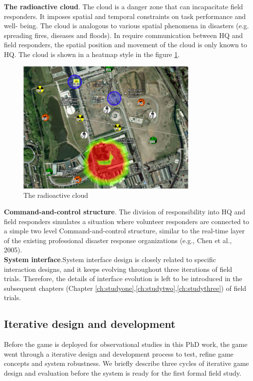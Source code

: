 \textbf{The radioactive cloud}. The cloud is a danger zone that can incapacitate field responders. It imposes spatial and temporal constraints on task performance and well- being. The cloud is analogous to various spatial phenomena in disasters (e.g. spreading fires, diseases and floods). In require communication between HQ and field responders, the spatial position and movement of the cloud is only known to HQ. The cloud is shown in a heatmap style in the figure \ref{fig:cloud}. \\

\begin{figure}[h]
  \centering
  \includegraphics[width=0.8\textwidth]{img/approach/radioactiveCloud}
  \caption{The radioactive cloud}
  \label{fig:cloud}
\end{figure}

\textbf{Command-and-control structure}. The division of responsibility into HQ and field responders simulates a situation where volunteer responders are connected to a simple two level Command-and-control structure, similar to the real-time layer of the existing professional disaster response organizations (e.g., Chen et al., 2005).\\

\textbf{System interface}.System interface design is closely related to specific interaction designs, and it keeps evolving throughout three iterations of field trials. Therefore, the details of interface evolution is left to be introduced in the subsequent chapters (Chapter \ref{ch:studyone},\ref{ch:studytwo},\ref{ch:studythree}) of field trials. \\

\subsection{Iterative design and development}
Before the game is deployed for observational studies in this PhD work, the game went through a iterative design and development process to test, refine game concepts and system robustness. We briefly describe three cycles of iterative game design and evaluation before the system is ready for the first formal field study.\\

